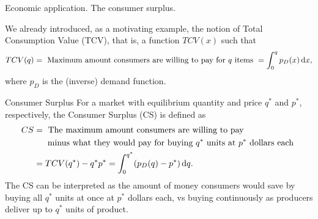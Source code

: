 \documentclass[9pt]{beamer}
\begin{document}
\begin{frame}{Economic application. The consumer surplus.}

    We already introduced, as a motivating example, the notion of Total Consumption Value (TCV), that is, a function $TCV(x)$ such that
    \begin{align*}
        TCV(q) = \text{ Maximum amount consumers are willing to pay for } q \text{ items } = \int_0^q p_D(x)\, \mathrm{d} x,
    \end{align*}
    where $p_D$ is the (inverse) demand function.

    \begin{block}{Consumer Surplus}
        For a market with equilibrium quantity and price $q^*$ and $p^*$, respectively, the Consumer Surplus (CS) is defined as
        \begin{align*}
            CS &= \text{ The maximum amount consumers are willing to pay }\\
            &\hspace{0.45cm} \text{ minus what they would pay for buying } q^* \text{ units at } p^* \text{ dollars each } \\
            &= TCV(q^*) - q^*p^* = \int_0^{q^*} (p_D(q) - p^*)\,\mathrm{d} q.
        \end{align*}
        The CS can be interpreted as the amount of money consumers would save by buying all $q^*$ units at once at $p^*$ dollars each, vs buying continuously as producers deliver up to $q^*$ units of product.
    \end{block}
    
\end{frame}
\end{document}
